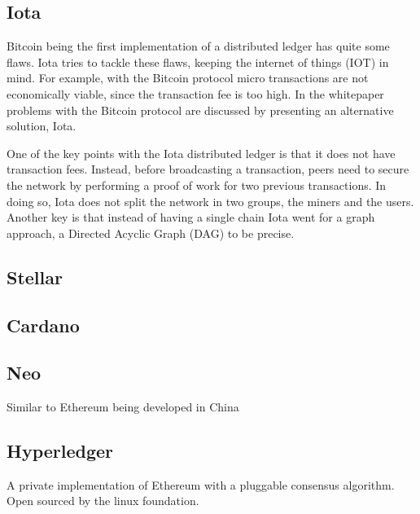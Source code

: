 \subsection{Iota}
Bitcoin being the first implementation of a distributed ledger has quite some flaws. Iota tries to tackle these flaws, keeping the internet of things (IOT) in mind. For example, with the Bitcoin protocol micro transactions are not economically viable, since the transaction fee is too high. In the whitepaper \cite{iota_wp} problems with the Bitcoin protocol are discussed by presenting an alternative solution, Iota.

One of the key points with the Iota distributed ledger is that it does not have transaction fees. Instead, before broadcasting a transaction, peers need to secure the network by performing a proof of work for two previous transactions. In doing so, Iota does not split the network in two groups, the miners and the users. Another key is that instead of having a single chain Iota went for a graph approach, a Directed Acyclic Graph (DAG) to be precise.
\subsection{Stellar}

\subsection{Cardano}

\subsection{Neo}
Similar to Ethereum being developed in China

\subsection{Hyperledger}
A private implementation of Ethereum with a pluggable consensus algorithm. Open sourced by the linux foundation.

